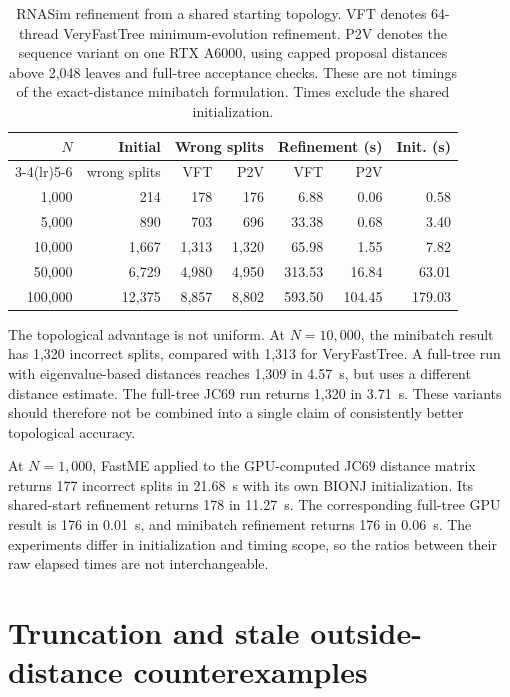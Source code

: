 \begin{table}[tb]
\centering
\caption{RNASim refinement from a shared starting topology. VFT denotes 64-thread VeryFastTree minimum-evolution refinement. P2V denotes the sequence variant on one RTX A6000, using capped proposal distances above 2,048 leaves and full-tree acceptance checks. These are not timings of the exact-distance minibatch formulation. Times exclude the shared initialization.}
\label{tab:rnasim_summary}
\small
\begin{tabular}{@{}rrrrrrr@{}}
\toprule
$N$ & Initial & \multicolumn{2}{c}{Wrong splits} & \multicolumn{2}{c}{Refinement (s)} & Init. (s)\\
\cmidrule(lr){3-4}\cmidrule(lr){5-6}
 & wrong splits & VFT & P2V & VFT & P2V & \\
\midrule
1,000 & 214 & 178 & 176 & 6.88 & 0.06 & 0.58\\
5,000 & 890 & 703 & 696 & 33.38 & 0.68 & 3.40\\
10,000 & 1,667 & 1,313 & 1,320 & 65.98 & 1.55 & 7.82\\
50,000 & 6,729 & 4,980 & 4,950 & 313.53 & 16.84 & 63.01\\
100,000 & 12,375 & 8,857 & 8,802 & 593.50 & 104.45 & 179.03\\
\bottomrule
\end{tabular}
\end{table}

The topological advantage is not uniform.
At $N=10{,}000$, the minibatch result has 1,320 incorrect splits, compared with 1,313 for VeryFastTree.
A full-tree run with eigenvalue-based distances reaches 1,309 in 4.57~s, but uses a different distance estimate.
The full-tree JC69 run returns 1,320 in 3.71~s.
These variants should therefore not be combined into a single claim of consistently better topological accuracy.

At $N=1{,}000$, FastME applied to the GPU-computed JC69 distance matrix returns 177 incorrect splits in 21.68~s with its own BIONJ initialization.
Its shared-start refinement returns 178 in 11.27~s.
The corresponding full-tree GPU result is 176 in 0.01~s, and minibatch refinement returns 176 in 0.06~s.
The experiments differ in initialization and timing scope, so the ratios between their raw elapsed times are not interchangeable.


\section{Truncation and stale outside-distance counterexamples}
\label{sec:counterexamples}

